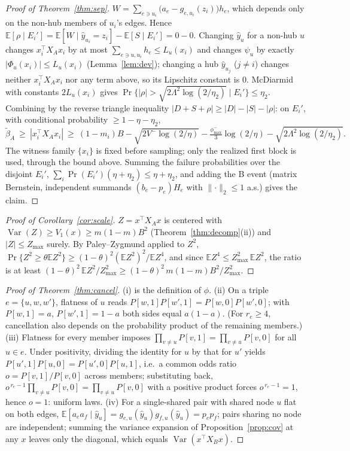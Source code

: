 \documentclass[preprint,11pt]{elsarticle}
\newcommand{\norm}[1]{\lVert #1\rVert}
\begin{document}
\begin{proof}[Proof of Theorem~\ref{thm:sep}]
$W=\sum_{e\ni u_i}\bigl(a_e-g_{e,u_i}(z_i)\bigr)h_e$, which depends
only on the non-hub members of $u_i$'s edges. Hence
$\mathbb E[\rho\mid E_i']
=\mathbb E[W\mid\hat y_{u_i}=z_i]-\mathbb E[S\mid E_i']=0-0$.
Changing $\hat y_u$ for a non-hub $u$ changes
$x_i^\top X_Ax_i$ by at most $\sum_{e\ni u,u_i}h_e\le L_u(x_i)$ and
changes $\psi_u$ by exactly $|\Phi_u(x_i)|\le L_u(x_i)$
(Lemma~\ref{lem:dev}); changing a hub $\hat y_{u_j}$ ($j\ne i$)
changes neither $x_i^\top X_Ax_i$ nor any term above, so its
Lipschitz constant is $0$. McDiarmid with constants $2L_u(x_i)$ gives
$\Pr\{|\rho|>\sqrt{2\Lambda^2\log(2/\eta_2)}\mid E_i'\}\le\eta_2$.
Combining by the reverse triangle inequality
$|D+S+\rho|\ge|D|-|S|-|\rho|$: on $E_i'$, with conditional
probability $\ge1-\eta-\eta_2$,
\[
\widetilde\beta_A\ \ge\ |x_i^\top X_Ax_i|\ \ge\ (1-m_i)B
-\sqrt{2V^-\log(2/\eta)}-\tfrac{\phi^-_{\max}}3\log(2/\eta)
-\sqrt{2\Lambda^2\log(2/\eta_2)} .
\]
The witness family $\{x_i\}$ is fixed before sampling; only the
realized first block is used, through the bound above. Summing the
failure probabilities over the disjoint $E_i'$,
$\sum_i\Pr(E_i')(\eta+\eta_2)\le\eta+\eta_2$, and adding the B event
(matrix Bernstein, independent summands
$(b_e-p_e)H_e$ with $\norm{\cdot}_2\le1$ a.s.) gives the claim.
\end{proof}

\begin{proof}[Proof of Corollary~\ref{cor:scale}]
$Z=x^\top X_Ax$ is centered with
$\operatorname{Var}(Z)\ge V_1(x)\ge m(1-m)B^2$
(Theorem~\ref{thm:decomp}(ii)) and $|Z|\le Z_{\max}$ surely. By
Paley--Zygmund applied to $Z^2$,
$\Pr\{Z^2\ge\theta\mathbb E Z^2\}\ge(1-\theta)^2(\mathbb EZ^2)^2/
\mathbb EZ^4$, and since $\mathbb E Z^4\le Z_{\max}^2\,\mathbb E Z^2$,
the ratio is at least $(1-\theta)^2\,\mathbb EZ^2/Z_{\max}^2\ge
(1-\theta)^2\,m(1-m)B^2/Z_{\max}^2$.
\end{proof}

\begin{proof}[Proof of Theorem~\ref{thm:cancel}]
(i) is the definition of $\phi$. (ii) On a triple
$e=\{u,w,w'\}$, flatness of $u$ reads
$P[w,1]P[w',1]=P[w,0]P[w',0]$; with $P[w,1]=a$, $P[w',1]=1-a$ both
sides equal $a(1-a)$. (For $r_e\ge4$, cancellation also depends on
the probability product of the remaining members.) (iii) Flatness for
every member imposes
$\prod_{v\ne u}P[v,1]=\prod_{v\ne u}P[v,0]$ for all $u\in e$. Under
positivity, dividing the identity for $u$ by that for $u'$ yields
$P[u',1]P[u,0]=P[u',0]P[u,1]$, i.e.\ a common odds ratio
$o=P[v,1]/P[v,0]$ across members; substituting back,
$o^{\,r_e-1}\prod_{v\ne u}P[v,0]=\prod_{v\ne u}P[v,0]$ with a
positive product forces $o^{\,r_e-1}=1$, hence $o=1$: uniform laws.
(iv) For a single-shared pair with shared node $u$ flat on both
edges, $\mathbb E[a_ea_f\mid\hat y_u]
=g_{e,u}(\hat y_u)g_{f,u}(\hat y_u)=p_ep_f$; pairs sharing no node
are independent; summing the variance
expansion of Proposition~\ref{prop:cov} at any $x$ leaves only
the diagonal, which equals $\operatorname{Var}(x^\top X_Bx)$.
\end{proof}
\end{document}
